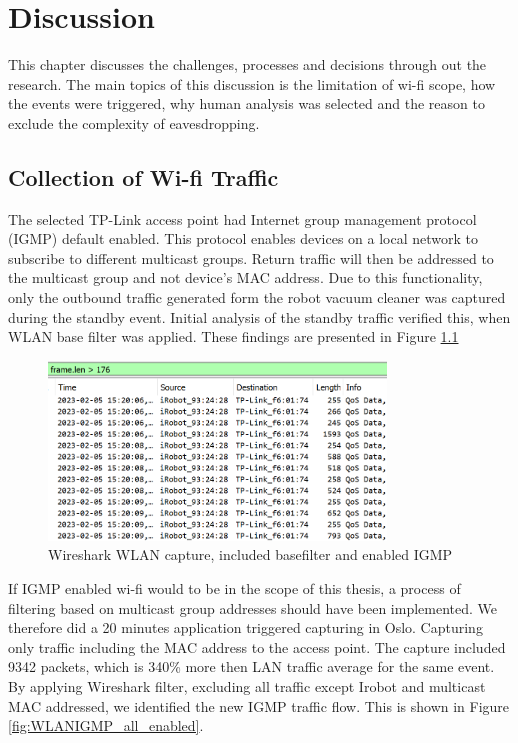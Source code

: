\chapter{Discussion}
This chapter discusses the challenges, processes and decisions through out the research. The main topics of this discussion is the limitation of wi-fi scope, how the events were triggered, why human analysis was selected and the reason to exclude the complexity of eavesdropping. 

\section{Collection of Wi-fi Traffic}
The selected TP-Link access point had Internet group management protocol (IGMP) \cite{igmp_rfc2236} default enabled. This protocol enables devices on a local network to subscribe to different multicast groups. Return traffic will then be addressed to the multicast group and not device's MAC address. Due to this functionality, only the outbound traffic generated form the robot vacuum cleaner was captured during the standby event. Initial analysis of the standby traffic verified this, when WLAN base filter was applied. These findings are presented in Figure \ref{fig:WLANIGMP_enabled}

\begin{figure}[H]
    \centering
    \includegraphics[width=0.8\textwidth]{figures/WLAN_IGMP_enabled.png}
    \caption{Wireshark WLAN capture, included basefilter and enabled IGMP}
    \label{fig:WLANIGMP_enabled}
\end{figure}

If IGMP enabled wi-fi would to be in the scope of this thesis, a process of filtering based on multicast group addresses should have been implemented. We therefore did a 20 minutes application triggered capturing in Oslo. Capturing only traffic including the MAC address to the access point. The capture included 9342 packets, which is 340\% more then LAN traffic average for the same event. By applying Wireshark filter, excluding all traffic except Irobot and multicast MAC addressed, we identified the new IGMP traffic flow. This is shown in Figure \ref{fig:WLANIGMP_all_enabled}. 

